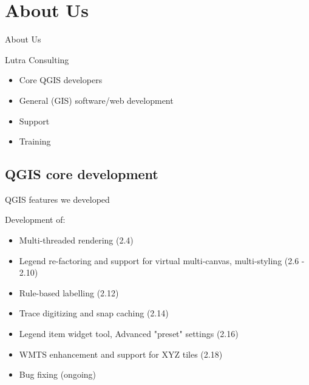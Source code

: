 \section{About Us}

\begin{frame}{About Us}
	\begin{block}{Lutra Consulting}
		\begin{itemize}
			\item Core QGIS developers
			\item General (GIS) software/web development
			\item Support
			\item Training
		\end{itemize}
	\end{block}
\end{frame}

\subsection{QGIS core development}
\begin{frame}{QGIS features we developed}
\begin{block}{Development of:}
	\begin{itemize}
		\item Multi-threaded rendering (2.4)
		\item Legend re-factoring and support for virtual multi-canvas, multi-styling (2.6 - 2.10)
		\item Rule-based labelling (2.12)
		\item Trace digitizing and snap caching (2.14)
		\item Legend item widget tool, Advanced "preset" settings (2.16)
		\item WMTS enhancement and support for XYZ tiles (2.18)
		\item Bug fixing (ongoing)
	\end{itemize}
\end{block}
\end{frame}



